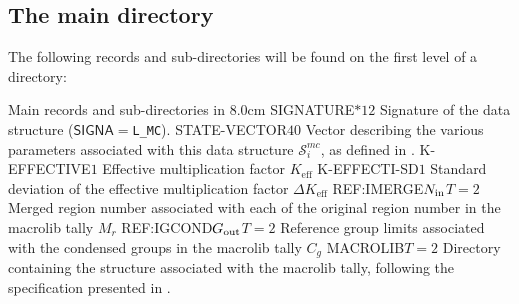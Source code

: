 \subsection{The main  directory}\label{sect:mcdirmain}

The following records and sub-directories will be found on the first level of a 
directory:

\begin{DescriptionEnregistrement}{Main records and sub-directories in }{8.0cm}
\CharEnr
  {SIGNATURE}{$*12$}
  {Signature of the  data structure ($\mathsf{SIGNA}=${\tt L\_MC}).}
\IntEnr
  {STATE-VECTOR}{$40$}
  {Vector describing the various parameters associated with this data structure
  $\mathcal{S}^{mc}_{i}$, as defined in .}
\RealEnr
  {K-EFFECTIVE}{$1$}{}
  {Effective multiplication factor $K_{\mathrm{eff}}$}
\RealEnr
  {K-EFFECTI-SD}{$1$}{}
  {Standard deviation of the effective multiplication factor $\Delta K_{\mathrm{eff}}$}
\OptIntEnr
  {REF:IMERGE}{$N_{\rm in}$}{$T =2$}
  {Merged region number associated with each of the original region number in the macrolib tally $M_{r}$}
\OptIntEnr
  {REF:IGCOND}{$G_{\rm out}$}{$T =2$}
  {Reference group limits associated with the condensed groups in the macrolib tally $C_{g}$}
\OptDirEnr
  {MACROLIB}{$T =2$}
  {Directory containing the  structure associated with the
  macrolib tally, following the specification presented in .}
\end{DescriptionEnregistrement}
